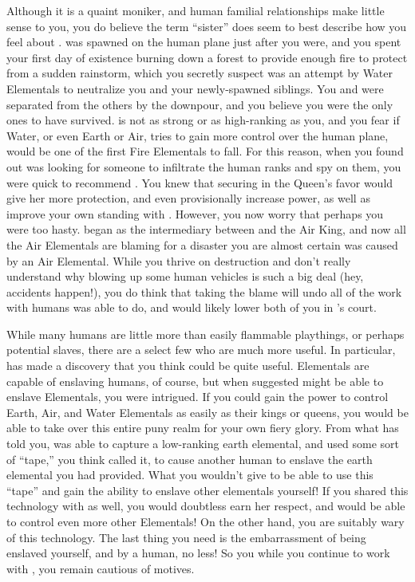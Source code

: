 \documentclass[char]{elementals}
\begin{document}
Although it is a quaint moniker, and human familial relationships make little sense to you, you do believe the term ``sister'' does seem to best describe how you feel about \cJuliet{}.  \cJuliet{\They} was spawned on the human plane just after you were, and you spent your first day of existence burning down a forest to provide enough fire to protect \cJuliet{\them} from a sudden rainstorm, which you secretly suspect was an attempt by Water Elementals to neutralize you and your newly-spawned siblings.  You and \cJuliet{} were separated from the others by the downpour, and you believe you were the only ones to have survived. \cJuliet{\they} is not as strong or as high-ranking as you, and you fear if Water, or even Earth or Air, tries to gain more control over the human plane, \cJuliet{\they} would be one of the first Fire Elementals to fall. For this reason, when you found out \cQueen{} was looking for someone to infiltrate the human ranks and spy on them, you were quick to recommend \cJuliet{}.  You knew that securing \cJuliet{\them} in the Queen's favor would give her more protection, and even provisionally increase \cJuliet{\their} power, as well as improve your own standing with \cQueen{}.  However, you now worry that perhaps you were too hasty.  \cJuliet{} began as the intermediary between \cQueen{} and the Air King, and now all the Air Elementals are blaming \cJuliet{\them} for a disaster you are almost certain was caused by an Air Elemental.  While you thrive on destruction and don't really understand why blowing up some human vehicles is such a big deal (hey, accidents happen!), you do think that \cJuliet{} taking the blame will undo all of the work with humans \cJuliet{\they} was able to do, and would likely lower both of you in \cQueen{}'s court.

While many humans are little more than easily flammable playthings, or perhaps potential slaves, there are a select few who are much more useful.  In particular, \cMS{\intro} has made a discovery that you think could be quite useful.  Elementals are capable of enslaving humans, of course, but when \cMS{} suggested  might be able to enslave Elementals, you were intrigued.  If you could gain the power to control Earth, Air, and Water Elementals as easily as their kings or queens, you would be able to take over this entire puny realm for your own fiery glory.  From what \cMS{} has told you, \cMS{\they} was able to capture a low-ranking earth elemental, and used some sort of ``tape,'' you think  called it, to cause another human to enslave the earth elemental you had provided.  What you wouldn't give to be able to use this ``tape'' and gain the ability to enslave other elementals yourself!  If you shared this technology with \cQueen{} as well, you would doubtless earn her respect, and  would be able to control even more other Elementals!  On the other hand, you are suitably wary of this technology.  The last thing you need is the embarrassment of being enslaved yourself, and by a human, no less!  So you while you continue to work with \cMS{}, you remain cautious of \cMS{\their} motives.
\end{document}
